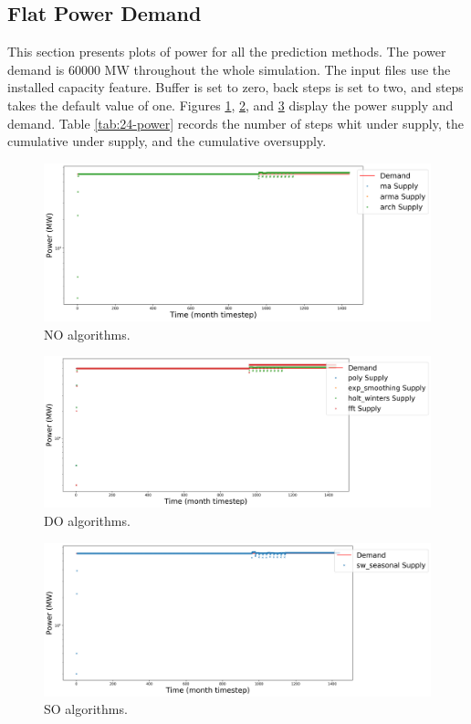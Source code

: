 \documentclass[11pt]{article}
\begin{document}
\subsection{Flat Power Demand}

This section presents plots of power for all the prediction methods. The power demand is 60000 MW throughout the whole simulation. The input files use the installed capacity feature. Buffer is set to zero, back steps is set to two, and steps takes the default value of one.
Figures \ref{fig:24-NO}, \ref{fig:24-DO}, and \ref{fig:24-SO} display the power supply and demand.
Table \ref{tab:24-power} records the number of steps whit under supply, the cumulative under supply, and the cumulative oversupply.

\begin{figure}[!h]
	\centering
	\includegraphics[width=\textwidth]{24-figures/24-power-buffer01.png} 
	\hfill
	\caption{NO algorithms.}
	\label{fig:24-NO}
\end{figure}

\begin{figure}[!h]
	\centering
	\includegraphics[width=\textwidth]{24-figures/24-power-buffer02.png} 
	\hfill
	\caption{DO algorithms.}
	\label{fig:24-DO}
\end{figure}

\begin{figure}[!h]
	\centering
	\includegraphics[width=\textwidth]{24-figures/24-power-buffer03.png} 
	\hfill
	\caption{SO algorithms.}
	\label{fig:24-SO}
\end{figure}
\end{document}
